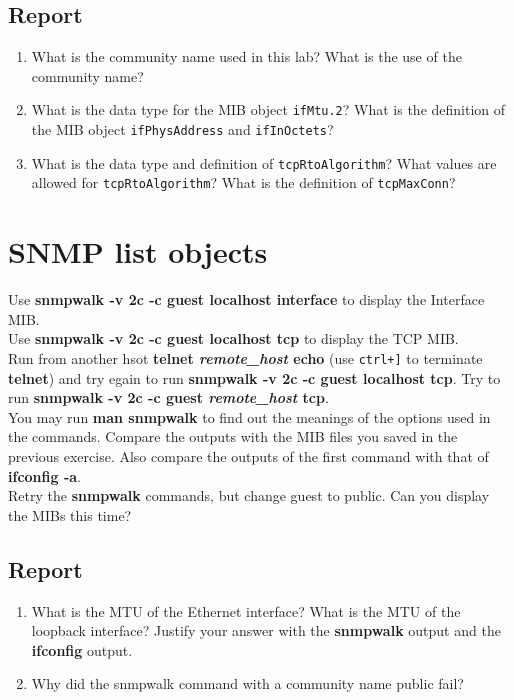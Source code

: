 \documentclass[10pt,a4paper]{article}
\numberwithin{equation}{section}
\numberwithin{figure}{section}
\numberwithin{table}{section}
\begin{document}
	\subsection*{Report}
	\begin{enumerate}
		\item What is the community name used in this lab? What is the use of the
		community name?
		\item What is the data type for the MIB object \texttt{ifMtu.2}? What is the definition of the MIB object \texttt{ifPhysAddress} and \texttt{ifInOctets}?
		\item What is the data type and definition of \texttt{tcpRtoAlgorithm}? What values are allowed for \texttt{tcpRtoAlgorithm}? What is the definition of \texttt{tcpMaxConn}?
	\end{enumerate}

\section{SNMP list objects}
	Use \textbf{snmpwalk -v 2c -c guest localhost interface} to display the Interface MIB.\\
	Use \textbf{snmpwalk -v 2c -c guest localhost tcp} to display the TCP MIB.\\
	Run from another hsot \textbf{telnet \textit{remote\_host} echo} (use \texttt{ctrl+]} to terminate \textbf{telnet}) and try egain to run \textbf{snmpwalk -v 2c -c guest localhost tcp}. Try to run \textbf{snmpwalk -v 2c -c guest \textit{remote\_host} tcp}.\\
	You may run \textbf{man snmpwalk} to find out the meanings of the options used in the commands. Compare the outputs with the MIB files you saved in the previous exercise. Also compare the outputs of the first command with that of \textbf{ifconfig -a}.\\
	Retry the \textbf{snmpwalk} commands, but change guest to public. Can you display the MIBs this time?
	
	\subsection*{Report}
	\begin{enumerate}
		\item What is the MTU of the Ethernet interface? What is the MTU of the loopback interface? Justify your answer with the \textbf{snmpwalk} output and the \textbf{ifconfig} output.
		\item Why did the snmpwalk command with a community name public fail?
	\end{enumerate}
\end{document}
